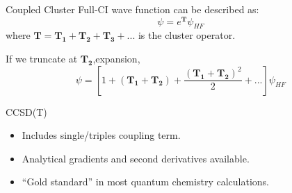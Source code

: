 \documentclass[aspectratio=169]{beamer}
\let \vec \mathbf
\begin{document}
    \begin{frame}{Coupled Cluster}
        Full-CI wave function can be described as:
        \begin{equation*}
            \psi = e^{\vec{T}}\psi_{HF}
        \end{equation*}
        where $\vec{T}=\vec{T_1}+\vec{T_2}+\vec{T_3}+...$ is the cluster operator.


        If we truncate at $\vec{T_2}$,expansion,
        \begin{equation*}
            \psi = [1+(\vec{T_1}+\vec{T_2})+\frac{(\vec{T_1}+\vec{T_2})^2}{2}+...]\psi_{HF}
        \end{equation*}

        \begin{alertblock}{CCSD(T)}
            \begin{itemize}
                \item Includes single/triples coupling term.
                \item Analytical gradients and second derivatives available.
                \item ``Gold standard'' in most quantum chemistry calculations.
            \end{itemize}
        \end{alertblock}

    \end{frame}
\end{document}
